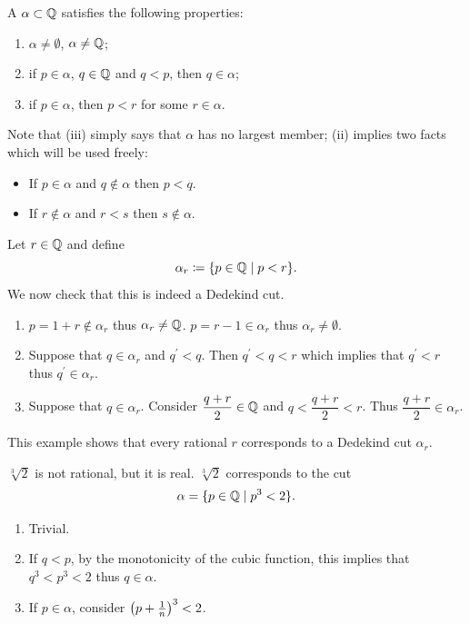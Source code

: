 \begin{definition}
A  $\alpha\subset\mathbb Q$ satisfies the following properties:
\begin{enumerate}[label=(\roman*)]
\item $\alpha\neq\emptyset$, $\alpha\neq\mathbb Q$;
\item if $p\in\alpha$, $q\in\mathbb Q$ and $q<p$, then $q\in\alpha$;
\item if $p\in\alpha$, then $p<r$ for some $r\in\alpha$.
\end{enumerate}
\end{definition}

Note that (iii) simply says that $\alpha$ has no largest member; (ii) implies two facts which will be used freely:
\begin{itemize}
\item If $p\in\alpha$ and $q\notin\alpha$ then $p<q$.
\item If $r\notin\alpha$ and $r<s$ then $s\notin\alpha$.
\end{itemize}

\begin{example}
Let $r\in\mathbb Q$ and define
\[ \alpha_r\coloneqq\{p\in\mathbb Q\mid p<r\}. \]
We now check that this is indeed a Dedekind cut.
\begin{enumerate}[label=(\arabic*)]
\item $p=1+r\notin\alpha_r$ thus $\alpha_r\neq\mathbb Q$. $p=r-1\in\alpha_r$ thus $\alpha_r\neq\emptyset$.

\item Suppose that $q\in\alpha_r$ and $q^\prime<q$. Then $q^\prime<q<r$ which implies that $q^\prime<r$ thus $q^\prime\in\alpha_r$.

\item Suppose that $q\in\alpha_r$. Consider $\dfrac{q+r}{2}\in\mathbb Q$ and $q<\dfrac{q+r}{2}<r$. Thus $\dfrac{q+r}{2}\in\alpha_r$.
\end{enumerate}
\end{example}

This example shows that every rational $r$ corresponds to a Dedekind cut $\alpha_r$.

\begin{example}
$\sqrt[3]{2}$ is not rational, but it is real. $\sqrt[3]{2}$ corresponds to the cut
\[ \alpha=\{p\in\mathbb Q\mid p^3<2\}. \]
\begin{enumerate}[label=(\arabic*)]
\item Trivial.
\item If $q<p$, by the monotonicity of the cubic function, this implies that $q^3<p^3<2$ thus $q\in\alpha$.
\item If $p\in\alpha$, consider $\left(p+\frac{1}{n}\right)^3<2$.
\end{enumerate}
\end{example}

